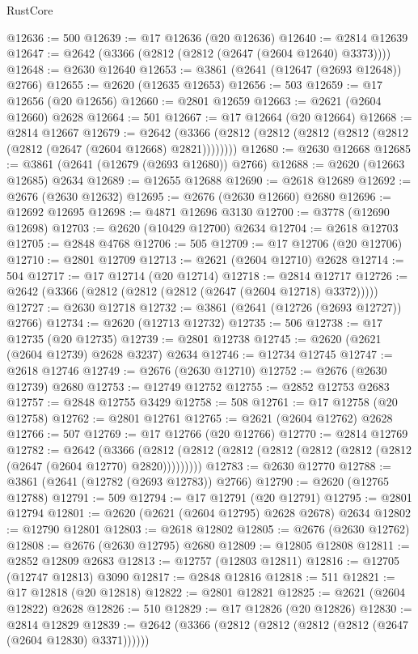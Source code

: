 \begin{lexlean}{RustCore}
\begin{coremodule}
@12636 := 500
@12639 := @17 @12636 (@20 @12636)
@12640 := @2814 @12639
@12647 := @2642 (@3366 (@2812 (@2812 (@2647 (@2604 @12640) @3373))))
@12648 := @2630 @12640
@12653 := @3861 (@2641 (@12647 (@2693 @12648)) @2766)
@12655 := @2620 (@12635 @12653)
@12656 := 503
@12659 := @17 @12656 (@20 @12656)
@12660 := @2801 @12659
@12663 := @2621 (@2604 @12660) @2628
@12664 := 501
@12667 := @17 @12664 (@20 @12664)
@12668 := @2814 @12667
@12679 := @2642 (@3366 (@2812 (@2812 (@2812 (@2812 (@2812 (@2812 (@2647 (@2604 @12668) @2821))))))))
@12680 := @2630 @12668
@12685 := @3861 (@2641 (@12679 (@2693 @12680)) @2766)
@12688 := @2620 (@12663 @12685) @2634
@12689 := @12655 @12688
@12690 := @2618 @12689
@12692 := @2676 (@2630 @12632)
@12695 := @2676 (@2630 @12660) @2680
@12696 := @12692 @12695
@12698 := @4871 @12696 @3130
@12700 := @3778 (@12690 @12698)
@12703 := @2620 (@10429 @12700) @2634
@12704 := @2618 @12703
@12705 := @2848 @4768
@12706 := 505
@12709 := @17 @12706 (@20 @12706)
@12710 := @2801 @12709
@12713 := @2621 (@2604 @12710) @2628
@12714 := 504
@12717 := @17 @12714 (@20 @12714)
@12718 := @2814 @12717
@12726 := @2642 (@3366 (@2812 (@2812 (@2812 (@2647 (@2604 @12718) @3372)))))
@12727 := @2630 @12718
@12732 := @3861 (@2641 (@12726 (@2693 @12727)) @2766)
@12734 := @2620 (@12713 @12732)
@12735 := 506
@12738 := @17 @12735 (@20 @12735)
@12739 := @2801 @12738
@12745 := @2620 (@2621 (@2604 @12739) @2628 @3237) @2634
@12746 := @12734 @12745
@12747 := @2618 @12746
@12749 := @2676 (@2630 @12710)
@12752 := @2676 (@2630 @12739) @2680
@12753 := @12749 @12752
@12755 := @2852 @12753 @2683
@12757 := @2848 @12755 @3429
@12758 := 508
@12761 := @17 @12758 (@20 @12758)
@12762 := @2801 @12761
@12765 := @2621 (@2604 @12762) @2628
@12766 := 507
@12769 := @17 @12766 (@20 @12766)
@12770 := @2814 @12769
@12782 := @2642
    (@3366 (@2812 (@2812 (@2812 (@2812 (@2812 (@2812 (@2812 (@2647 (@2604 @12770) @2820)))))))))
@12783 := @2630 @12770
@12788 := @3861 (@2641 (@12782 (@2693 @12783)) @2766)
@12790 := @2620 (@12765 @12788)
@12791 := 509
@12794 := @17 @12791 (@20 @12791)
@12795 := @2801 @12794
@12801 := @2620 (@2621 (@2604 @12795) @2628 @2678) @2634
@12802 := @12790 @12801
@12803 := @2618 @12802
@12805 := @2676 (@2630 @12762)
@12808 := @2676 (@2630 @12795) @2680
@12809 := @12805 @12808
@12811 := @2852 @12809 @2683
@12813 := @12757 (@12803 @12811)
@12816 := @12705 (@12747 @12813) @3090
@12817 := @2848 @12816
@12818 := 511
@12821 := @17 @12818 (@20 @12818)
@12822 := @2801 @12821
@12825 := @2621 (@2604 @12822) @2628
@12826 := 510
@12829 := @17 @12826 (@20 @12826)
@12830 := @2814 @12829
@12839 := @2642 (@3366 (@2812 (@2812 (@2812 (@2812 (@2647 (@2604 @12830) @3371))))))

\end{coremodule}
\end{lexlean}
